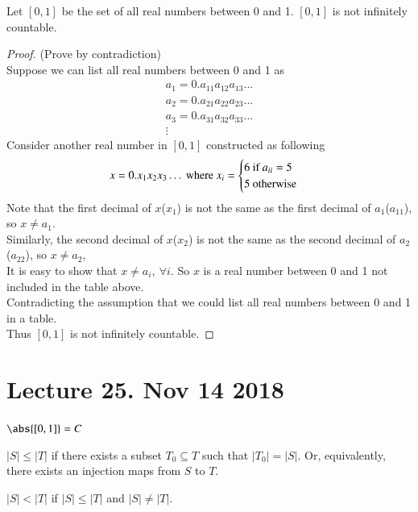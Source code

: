\documentclass[10pt]{article}
\begin{document}
		\begin{theorem}
			Let $[0,1]$ be the set of all real numbers between 0 and 1. $[0,1]$ is not infinitely countable.
		\end{theorem}
		\begin{proof}
			(Prove by contradiction) \\
			Suppose we can list all real numbers between 0 and 1 as 
			\begin{gather*}
				a_1 = 0.a_{11}a_{12}a_{13}\dots \\
				a_2 = 0.a_{21}a_{22}a_{23}\dots \\
				a_3 = 0.a_{31}a_{32}a_{33}\dots \\
				\vdots
			\end{gather*}
			Consider another real number in $[0,1]$ constructed as following
			\[
				x = 0.x_1 x_2 x_3 \dots \text{{ where }} x_i = \begin{cases}
					6 \text{{ if }} a_{ii} = 5 \\
					5 \text{{ otherwise}}
				\end{cases}
			\]
			Note that the first decimal of $x$($x_1$) is not the same as the first decimal of $a_1$($a_{11}$), so $x \neq a_1$. \\
			Similarly, the second decimal of $x$($x_2$) is not the same as the second decimal of $a_2$($a_{22}$), so $x \neq a_2$, \\
			It is easy to show that $x \neq a_i,\ \forall i$. So $x$ is a real number between 0 and 1 not included in the table above. \\
			Contradicting the assumption that we could list all real numbers between 0 and 1 in a table. \\
			Thus $[0,1]$ is not infinitely countable.
		\end{proof}
		
	\section{Lecture 25. Nov 14 2018}
		\begin{notation}
			$\abs{[0,1]}=C$
		\end{notation}
		
		\begin{definition}
			$|S| \leq |T|$ if there exists a subset $T_0 \subseteq T$ such that $|T_0| = |S|$. Or, equivalently, there exists an injection maps from $S$ to $T$.
		\end{definition}
		
		\begin{definition}
			$|S| < |T|$ if $|S| \leq |T|$ and $|S| \neq |T|$.
		\end{definition}
		
\end{document}
